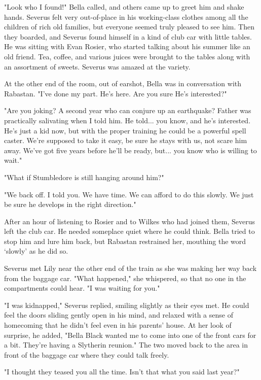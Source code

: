 \documentclass[a4paper,11pt]{article}
\begin{document}
"Look who I found!" Bella called, and others came up to greet him and shake hands. Severus felt very out-of-place in his working-class clothes among all the children of rich old families, but everyone seemed truly pleased to see him. Then they boarded, and Severus found himself in a kind of club car with little tables. He was sitting with Evan Rosier, who started talking about his summer like an old friend. Tea, coffee, and various juices were brought to the tables along with an assortment of sweets. Severus was amazed at the variety.

At the other end of the room, out of earshot, Bella was in conversation with Rabastan. "I've done my part. He's here. Are you sure He's interested?"

"Are you joking? A second year who can conjure up an earthquake? Father was practically salivating when I told him. He told... you know, and he's interested. He's just a kid now, but with the proper training he could be a powerful spell caster. We're supposed to take it easy, be sure he stays with us, not scare him away. We've got five years before he'll be ready, but... you know who is willing to wait."

"What if Stumbledore is still hanging around him?"

"We back off. I told you. We have time. We can afford to do this slowly. We just be sure he develops in the right direction."

After an hour of listening to Rosier and to Wilkes who had joined them, Severus left the club car. He needed someplace quiet where he could think. Bella tried to stop him and lure him back, but Rabastan restrained her, mouthing the word `slowly' as he did so.

Severus met Lily near the other end of the train as she was making her way back from the baggage car. "What happened," she whispered, so that no one in the compartments could hear. "I was waiting for you."

"I was kidnapped," Severus replied, smiling slightly as their eyes met. He could feel the doors sliding gently open in his mind, and relaxed with a sense of homecoming that he didn't feel even in his parents' house. At her look of surprise, he added, "Bella Black wanted me to come into one of the front cars for a bit. They're having a Slytherin reunion." The two moved back to the area in front of the baggage car where they could talk freely.

"I thought they teased you all the time. Isn't that what you said last year?"
\end{document}
